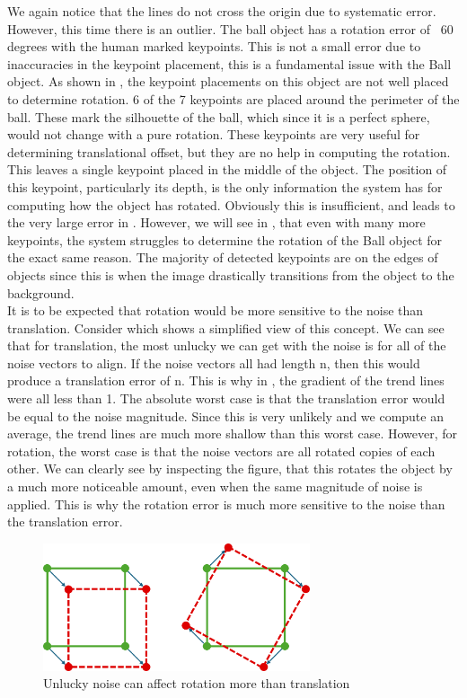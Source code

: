 We again notice that the lines do not cross the origin due to systematic error. However, this time there is an outlier. The ball object has a rotation error of ~60 degrees with the human marked keypoints. This is not a small error due to inaccuracies in the keypoint placement, this is a fundamental issue with the Ball object. As shown in , the keypoint placements on this object are not well placed to determine rotation. 6 of the 7 keypoints are placed around the perimeter of the ball. These mark the silhouette of the ball, which since it is a perfect sphere, would not change with a pure rotation. These keypoints are very useful for determining translational offset, but they are no help in computing the rotation. This leaves a single keypoint placed in the middle of the object. The position of this keypoint, particularly its depth, is the only information the system has for computing how the object has rotated. Obviously this is insufficient, and leads to the very large error in . However, we will see in , that even with many more keypoints, the system struggles to determine the rotation of the Ball object for the exact same reason. The majority of detected keypoints are on the edges of objects since this is when the image drastically transitions from the object to the background.\\

It is to be expected that rotation would be more sensitive to the noise than translation. Consider  which shows a simplified view of this concept. We can see that for translation, the most unlucky we can get with the noise is for all of the noise vectors to align. If the noise vectors all had length n, then this would produce a translation error of n. This is why in , the gradient of the trend lines were all less than 1. The absolute worst case is that the translation error would be equal to the noise magnitude. Since this is very unlikely and we compute an average, the trend lines are much more shallow than this worst case. However, for rotation, the worst case is that the noise vectors are all rotated copies of each other. We can clearly see by inspecting the figure, that this rotates the object by a much more noticeable amount, even when the same magnitude of noise is applied. This is why the rotation error is much more sensitive to the noise than the translation error.

\begin{figure}[h]
    \centering
    \includegraphics[width=0.7\textwidth]{figures/noise-difference.png}
    \caption{Unlucky noise can affect rotation more than translation}
    \label{fig:noise-difference}
\end{figure}

